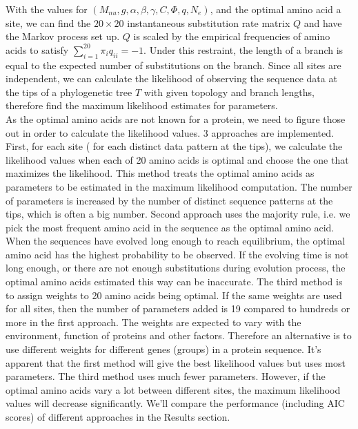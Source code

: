 \documentclass[13pt]{article}
\begin{document}
With the values for $(M_{nu},g, \alpha, \beta, \gamma, C, \Phi, q, N_e)$, and the optimal amino acid a site, we can find the $20 \times 20$ instantaneous substitution rate matrix $Q$ and have the Markov process set up. $Q$ is scaled by the empirical frequencies of amino acids to satisfy $\sum_{i=1}^{20} \pi_i q_{ii}= -1$. Under this restraint, the length of a branch is equal to the expected number of substitutions on the branch. Since all sites are independent, we can calculate the likelihood of observing the sequence data at the tips of a phylogenetic tree $T$ with given topology and branch lengths, therefore find the maximum likelihood estimates for parameters. \\

As the optimal amino acids are not known for a protein, we need to figure those out in order to calculate the likelihood values. 3 approaches are implemented. First, for each site ( for each distinct data pattern at the tips), we calculate the likelihood values when each of 20 amino acids is optimal and choose the one that maximizes the likelihood. This method treats the optimal amino acids as parameters to be estimated in the maximum likelihood computation. The number of parameters is increased by the number of distinct sequence patterns at the tips, which is often a big number. Second approach uses the majority rule, i.e. we pick the most frequent amino acid in the sequence as the optimal amino acid. When the sequences have evolved long enough to reach equilibrium, the optimal amino acid has the highest probability to be observed. If the evolving time is not long enough, or there are not enough substitutions during evolution process, the optimal amino acids estimated this way can be inaccurate. The third method is to assign weights to 20 amino acids being optimal. If the same weights are used for all sites, then the number of parameters added is 19 compared to hundreds or more in the first approach. The weights are expected to vary with the environment, function of proteins and other factors. Therefore an alternative is to use different weights for different genes (groups) in a protein sequence. It's apparent that the first method will give the best likelihood values but uses most parameters. The third method uses much fewer parameters. However, if the optimal amino acids vary a lot between different sites, the maximum likelihood values will decrease significantly. We'll compare the performance (including AIC scores) of different approaches in the Results section.\\
\end{document}

